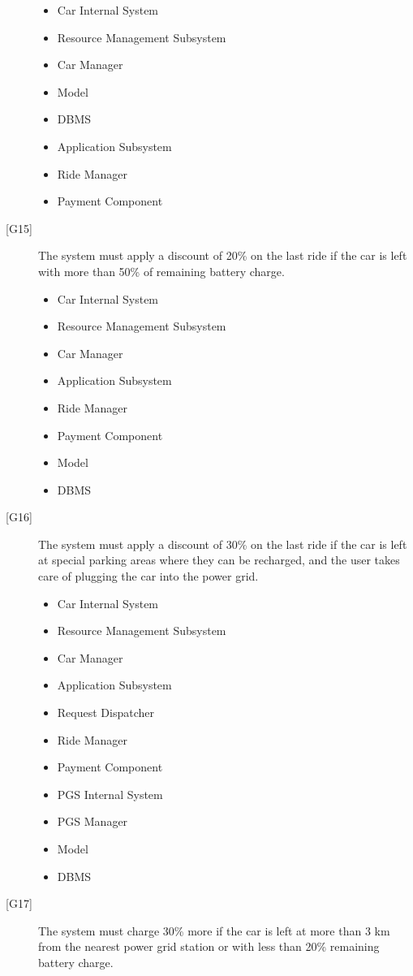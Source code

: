 \documentclass[english]{article}
\begin{document}
\begin{description}
	\begin{itemize}
		\item{Car Internal System}
		\item{Resource Management Subsystem}
		\item{Car Manager}
		\item{Model}
		\item{DBMS}
		\item{Application Subsystem}
		\item{Ride Manager}
		\item{Payment Component}
	\end{itemize}
	\item[{[G15]}]{The system must apply a discount of 20\% on the last ride if the car is left with more than 50\% of remaining battery charge.}
	\begin{itemize}
		\item{Car Internal System}
		\item{Resource Management Subsystem}
		\item{Car Manager}
		\item{Application Subsystem}
		\item{Ride Manager}
		\item{Payment Component}
		\item{Model}
		\item{DBMS}
	\end{itemize}
	\item[{[G16]}]{The system must apply a discount of 30\% on the last ride if the car is left at special parking areas where they can be recharged, and the user takes care of plugging the car into the power grid.}
	\begin{itemize}
		\item{Car Internal System}
		\item{Resource Management Subsystem}
		\item{Car Manager}
		\item{Application Subsystem}
		\item{Request Dispatcher}
		\item{Ride Manager}
		\item{Payment Component}
		\item{PGS Internal System}
		\item{PGS Manager}
		\item{Model}
		\item{DBMS}
	\end{itemize}
	\item[{[G17]}]{The system must charge 30\% more if the car is left at more than 3 km from the nearest power grid station or with less than 20\% remaining battery charge.}

\end{description}
\end{document}
